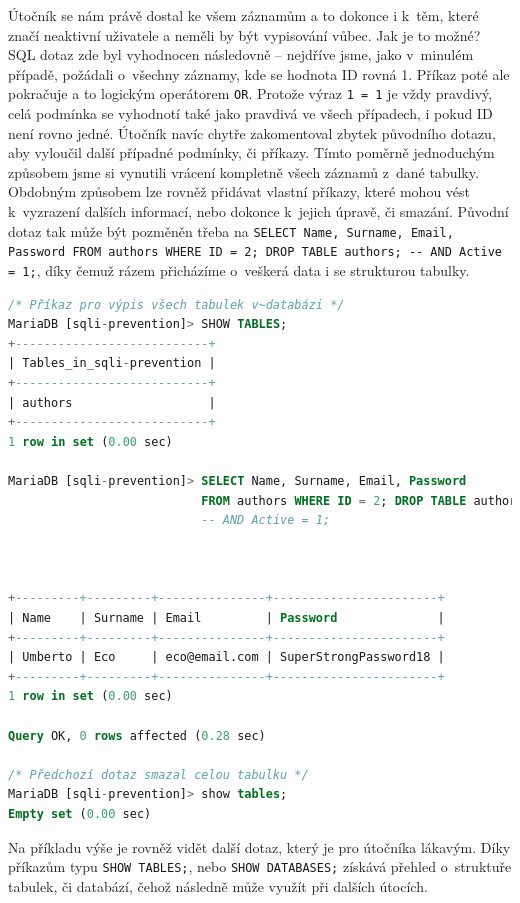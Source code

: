 Útočník se nám právě dostal ke všem záznamům a to dokonce i k~těm, které značí neaktivní uživatele a neměli by být vypisování vůbec.
Jak je to možné? SQL dotaz zde byl vyhodnocen následovně -- nejdříve jsme, jako v~minulém případě, požádali o~všechny záznamy, kde
se hodnota ID rovná 1. Příkaz poté ale pokračuje a to logickým operátorem \texttt{OR}. Protože výraz \texttt{1 = 1} je vždy pravdivý,
celá podmínka se vyhodnotí také jako pravdivá ve všech případech, i pokud ID není rovno jedné. Útočník navíc chytře zakomentoval
zbytek původního dotazu, aby vyloučil další případné podmínky, či příkazy. Tímto poměrně jednoduchým způsobem jsme si vynutili
vrácení kompletně všech záznamů z~dané tabulky.\\

\Bat{} Obdobným způsobem lze rovněž přidávat vlastní příkazy, které mohou vést k~vyzrazení dalších informací, nebo dokonce k~jejich úpravě,
či smazání. Původní dotaz tak může být pozměněn třeba na 
\texttt{SELECT Name, Surname, Email, Password FROM authors WHERE ID = 2; DROP TABLE authors; -{}- AND Active = 1;},
díky čemuž rázem přicházíme o~veškerá data i se strukturou tabulky.

\begin{lstlisting}[language=sql]
/* Příkaz pro výpis všech tabulek v~databázi */
MariaDB [sqli-prevention]> SHOW TABLES;
+---------------------------+
| Tables_in_sqli-prevention |
+---------------------------+
| authors                   |
+---------------------------+
1 row in set (0.00 sec)

MariaDB [sqli-prevention]> SELECT Name, Surname, Email, Password 
                           FROM authors WHERE ID = 2; DROP TABLE authors; 
                           -- AND Active = 1;



+---------+---------+---------------+-----------------------+
| Name    | Surname | Email         | Password              |
+---------+---------+---------------+-----------------------+
| Umberto | Eco     | eco@email.com | SuperStrongPassword18 |
+---------+---------+---------------+-----------------------+
1 row in set (0.00 sec)

Query OK, 0 rows affected (0.28 sec)

/* Předchozí dotaz smazal celou tabulku */
MariaDB [sqli-prevention]> show tables;
Empty set (0.00 sec)
\end{lstlisting}

Na příkladu výše je rovněž vidět další dotaz, který je pro útočníka lákavým. Díky příkazům typu \texttt{SHOW TABLES;}, nebo
\texttt{SHOW DATABASES;} získává přehled o~struktuře tabulek, či databází, čehož následně může využít při dalších útocích. \\

